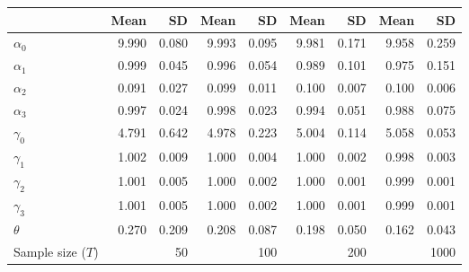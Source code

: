 
\begin{tabular}[t]{lrrrrrrrr}
\toprule
  & Mean & SD & Mean  & SD  & Mean   & SD   & Mean    & SD   \\
\midrule
$\alpha_{0}$ & 9.990 & 0.080 & 9.993 & 0.095 & 9.981 & 0.171 & 9.958 & 0.259\\
$\alpha_{1}$ & 0.999 & 0.045 & 0.996 & 0.054 & 0.989 & 0.101 & 0.975 & 0.151\\
$\alpha_{2}$ & 0.091 & 0.027 & 0.099 & 0.011 & 0.100 & 0.007 & 0.100 & 0.006\\
$\alpha_{3}$ & 0.997 & 0.024 & 0.998 & 0.023 & 0.994 & 0.051 & 0.988 & 0.075\\
$\gamma_{0}$ & 4.791 & 0.642 & 4.978 & 0.223 & 5.004 & 0.114 & 5.058 & 0.053\\
$\gamma_{1}$ & 1.002 & 0.009 & 1.000 & 0.004 & 1.000 & 0.002 & 0.998 & 0.003\\
$\gamma_{2}$ & 1.001 & 0.005 & 1.000 & 0.002 & 1.000 & 0.001 & 0.999 & 0.001\\
$\gamma_{3}$ & 1.001 & 0.005 & 1.000 & 0.002 & 1.000 & 0.001 & 0.999 & 0.001\\
$\theta$ & 0.270 & 0.209 & 0.208 & 0.087 & 0.198 & 0.050 & 0.162 & 0.043\\
Sample size ($T$) &  & 50 &  & 100 &  & 200 &  & 1000\\
\bottomrule
\end{tabular}
